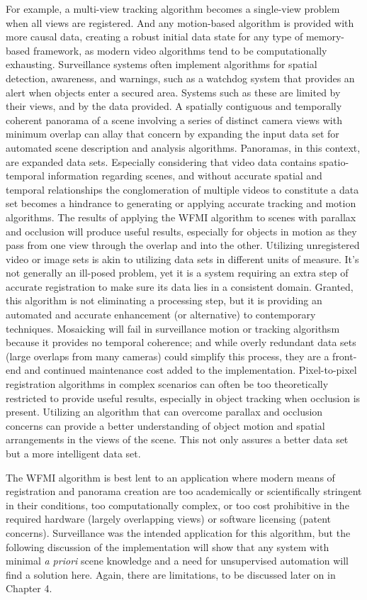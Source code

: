 For example, a multi-view tracking algorithm becomes a single-view problem when all views are registered. And any motion-based algorithm is provided with more causal data, creating a robust initial data state for any type of memory-based framework, as modern video algorithms tend to be computationally exhausting. Surveillance systems often implement algorithms for spatial detection, awareness, and warnings, such as a watchdog system that provides an alert when objects enter a secured area. Systems such as these are limited by their views, and by the data provided. A spatially contiguous and temporally coherent panorama of a scene involving a series of distinct camera views with minimum overlap can allay that concern by expanding the input data set for automated scene description and analysis algorithms. Panoramas, in this context, are expanded data sets. Especially considering that video data contains spatio-temporal information regarding scenes, and without accurate spatial and temporal relationships the conglomeration of multiple videos to constitute a data set becomes a hindrance to generating or applying accurate tracking and motion algorithms. The results of applying the WFMI algorithm to scenes with parallax and occlusion will produce useful results, especially for objects in motion as they pass from one view through the overlap and into the other. Utilizing unregistered video or image sets is akin to utilizing data sets in different units of measure. It's not generally an ill-posed problem, yet it is a system requiring an extra step of accurate registration to make sure its data lies in a consistent domain. Granted, this algorithm is not eliminating a processing step, but it is providing an automated and accurate enhancement (or alternative) to contemporary techniques. Mosaicking will fail in surveillance motion or tracking algorithsm because it provides no temporal coherence; and while overly redundant data sets (large overlaps from many cameras) could simplify this process, they are a front-end and continued maintenance cost added to the implementation. Pixel-to-pixel registration algorithms in complex scenarios can often be too theoretically restricted to provide useful results, especially in object tracking when occlusion is present. Utilizing an algorithm that can overcome parallax and occlusion concerns can provide a better understanding of object motion and spatial arrangements in the views of the scene. This not only assures a better data set but a more intelligent data set.

The WFMI algorithm is best lent to an application where modern means of registration and panorama creation are too academically or scientifically stringent in their conditions, too computationally complex, or too cost prohibitive in the required hardware (largely overlapping views) or software licensing (patent concerns). Surveillance was the intended application for this algorithm, but the following discussion of the implementation will show that any system with minimal \textit{a priori} scene knowledge and a need for unsupervised automation will find a solution here. Again, there are limitations, to be discussed later on in Chapter 4.




